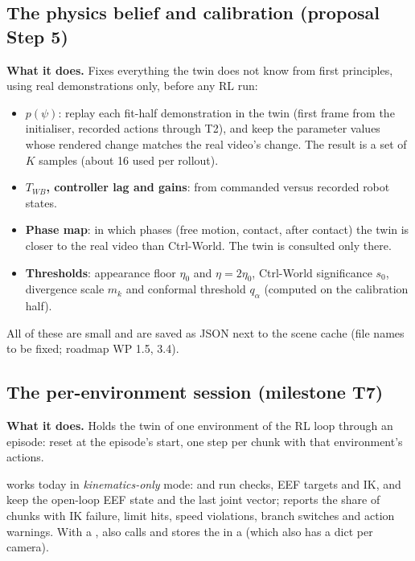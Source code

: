 \subsection{The physics belief and calibration (proposal Step 5) \planned}\label{twin:sec:calib}
\textbf{What it does.} Fixes everything the twin does not know from first principles, using real demonstrations only, before any RL run:
\begin{itemize}
\item \textbf{$p(\psi)$}: replay each fit-half demonstration in the twin (first frame from the initialiser, recorded actions through T2), and keep the parameter values whose rendered change matches the real video's change. The result is a set of $K$ samples (about 16 used per rollout).
\item \textbf{$T_{WB}$, controller lag and gains}: from commanded versus recorded robot states.
\item \textbf{Phase map}: in which phases (free motion, contact, after contact) the twin is closer to the real video than Ctrl-World. The twin is consulted only there.
\item \textbf{Thresholds}: appearance floor $\eta_0$ and $\eta=2\eta_0$, Ctrl-World significance $s_0$, divergence scale $m_k$ and conformal threshold $q_\alpha$ (computed on the calibration half).
\end{itemize}
All of these are small and are saved as JSON next to the scene cache (file names to be fixed; roadmap WP 1.5, 3.4).

\subsection{The per-environment session (milestone T7) \skel}\label{twin:sec:session}
\textbf{What it does.} Holds the twin of one environment of the RL loop through an episode: reset at the episode's start, one step per chunk with that environment's actions.

\begin{incode}
 works today in \emph{kinematics-only} mode:  and  run checks, EEF targets and IK, and keep the open-loop EEF state and the last joint vector;  reports the share of chunks with IK failure, limit hits, speed violations, branch switches and action warnings. With a ,  also calls  and stores the  in a  (which also has a  dict per camera).
\end{incode}

